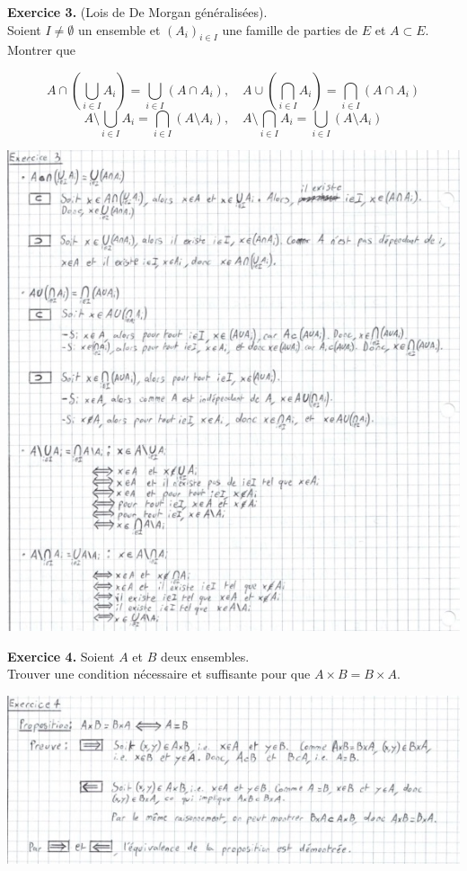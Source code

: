 \documentclass[a4paper, 10pt]{report}
\begin{document}
	\newpage
	
	\fancyhf{}
	\renewcommand{\headrule}
	{\rule{\textwidth}{0pt}}
	
	\noindent
	\textbf{Exercice 3.} (Lois de De Morgan généralisées).\\
	Soient $I \neq \emptyset$ un ensemble et $(A_i)_{i \in I}$
	une famille de parties de $E$ et $A \subset E$. Montrer que
	
	\[
		A \cap \left(\bigcup\limits_{i \in I} A_i\right) =
			\bigcup\limits_{i \in I}(A \cap A_i),
		\quad
		A \cup \left(\bigcap\limits_{i \in I} A_i\right) =
			\bigcap\limits_{i \in I}(A \cap A_i)
	\]
	\[
		A \setminus \bigcup\limits_{i \in I} A_i =
			\bigcap\limits_{i \in I} (A \setminus A_i),
		\quad
		A \setminus \bigcap\limits_{i \in I} A_i =
			\bigcup\limits_{i \in I} (A \setminus A_i)
	\]
	
	\includegraphics{ex03.jpg}

	\newpage
	
	\noindent
	{\color{red}\textbf{Exercice 4.}}
	Soient $A$ et $B$ deux ensembles.\\
	Trouver une condition nécessaire et suffisante pour que
	$A \times B = B \times A$.
	
	\includegraphics{ex04.jpg}
	
\end{document}
